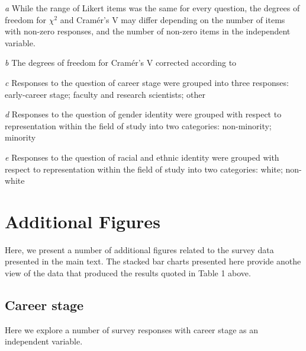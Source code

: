 \documentclass{aastex62}
\begin{document}
\begin{table}
\begin{threeparttable}
\begin{tablenotes}
      \item[\emph{a}]{While the range of Likert items was the same for every question, the degrees of freedom for $\chi^2$ and Cram\'{e}r's V may differ depending on the number of items with non-zero responses, and the number of non-zero items in the independent variable.}
      \item[\emph{b}]{The degrees of freedom for Cram\'{e}r's V corrected according to~\citep{bergsma2013}}
      \item[\emph{c}]{Responses to the question of career stage were grouped into three responses: early-career stage; faculty and research scientists; other}
      \item[\emph{d}]{Responses to the question of gender identity were grouped with respect to representation within the field of study into two categories: non-minority; minority}
      \item[\emph{e}]{Responses to the question of racial and ethnic identity were grouped with respect to representation within the field of study into two categories: white; non-white}
\end{tablenotes}

\end{threeparttable}
\label{tab:survey}
\end{table}

\clearpage

\section{Additional Figures}
\label{sec:suppfigures}
Here, we present a number of additional figures related to the survey data presented in the main text. The stacked bar charts presented here provide anothe view of the data that produced the results quoted in Table 1 above.

\subsection{Career stage}

Here we explore a number of survey responses with career stage as an independent variable.
\end{document}
